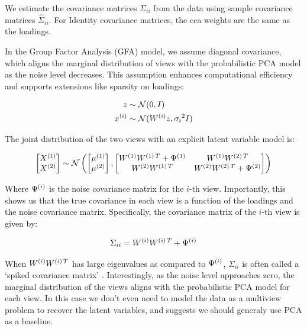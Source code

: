 We estimate the covariance matrices \(\Sigma_{ii}\) from the data using sample covariance matrices \(\hat{\Sigma}_{ii}\).
For Identity covariance matrices, the \acrshort{cca} weights are the same as the loadings.

In the Group Factor Analysis (GFA) model, we assume diagonal covariance, which aligns the marginal distribution of views with the probabilistic PCA model as the noise level decreases.
This assumption enhances computational efficiency and supports extensions like sparsity on loadings:

\begin{align}
    z &\sim \mathcal{N}(0, I)\\
    x^{(i)} &\sim \mathcal{N}(W^{(i)} z, {\sigma_{i}}^{2}I)
\end{align}

The joint distribution of the two views with an explicit latent variable model is:

\begin{align}
    \begin{bmatrix}
        X^{(1)} \\ X^{(2)}
    \end{bmatrix} \sim \mathcal{N} \left( \begin{bmatrix}
                                              \mu^{(1)} \\ \mu^{(2)}
    \end{bmatrix}, \begin{bmatrix}
                       W^{(1)}W^{(1)\,T} + \Psi^{(1)} & W^{(1)}W^{(2)\,T} \\ W^{(2)}W^{(1)\,T} & W^{(2)}W^{(2)\,T} + \Psi^{(2)}
    \end{bmatrix} \right)
\end{align}

Where \(\Psi^{(i)}\) is the noise covariance matrix for the \(i\)-th view.
Importantly, this shows us that the true covariance in each view is a function of the loadings and the noise covariance matrix.
Specifically, the covariance matrix of the \(i\)-th view is given by:

\begin{align}
    \Sigma_{ii} = W^{(i)}W^{(i)\,T} + \Psi^{(i)}
\end{align}

When $W^{(i)}W^{(i)\,T}$ has large eigenvalues as compared to $\Psi^{(i)}$, $\Sigma_{ii}$ is often called a `spiked covariance matrix' \citep{johnstone2001distribution}.
Interestingly, as the noise level approaches zero, the marginal distribution of the views aligns with the probabilistic PCA model for each view.
In this case we don't even need to model the data as a multiview problem to recover the latent variables, and suggests we should generaly use PCA as a baseline.

